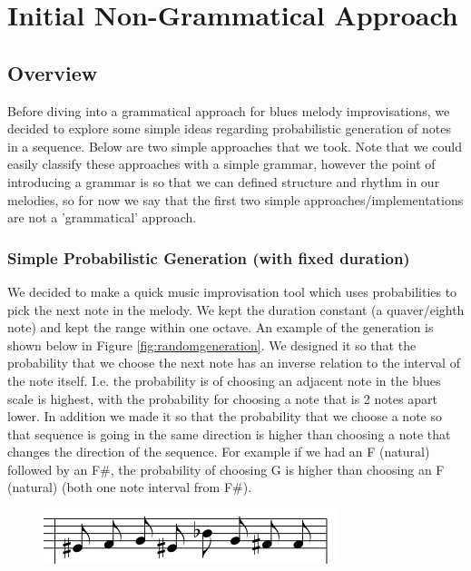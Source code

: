\documentclass[pdftex,12pt,a4paper]{report}
\begin{document}
\pagebreak

\chapter{Initial Non-Grammatical Approach}

\section{Overview}
Before diving into a grammatical approach for blues melody improvisations, we decided to explore some simple ideas regarding probabilistic generation of notes in a sequence. Below are two simple approaches that we took. Note that we could easily classify these approaches with a simple grammar, however the point of introducing a grammar is so that we can defined structure and rhythm in our melodies, so for now we say that the first two simple approaches/implementations are not a 'grammatical' approach. 

\subsection{Simple Probabilistic Generation (with fixed duration)}
We decided to make a quick music improvisation tool which uses probabilities to pick the next note in the melody. We kept the duration constant (a quaver/eighth note) and kept the range within one octave. An example of the generation is shown below in Figure \ref{fig:randomgeneration}. We designed it so that the probability that we choose the next note has an inverse relation to the interval of the note itself. I.e. the probability is of choosing an adjacent note in the blues scale is highest, with the probability for choosing a note that is 2 notes apart lower. In addition we made it so that the probability that we choose a note so that sequence is going in the same direction is higher than choosing a note that changes the direction of the sequence. For example if we had an F (natural) followed by an F\#, the probability of choosing G is higher than choosing an F (natural) (both one note interval from F\#).

\begin{figure}[here]
  \centering
  \includegraphics[scale=0.7]{figure/randomgeneration.png}
  \label{fig:probabilisticgeneration}
\end{figure}
\end{document}
